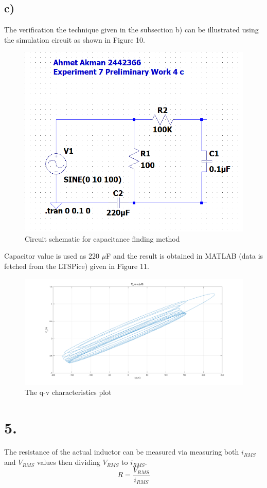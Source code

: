 \documentclass[letterpaper,12pt]{article}
\begin{document}
\subsection{c)}
The verification the technique given in the subsection b) can be illustrated using the simulation circuit as shown in Figure 10.
\begin{figure}[H]
	\centering
   \includegraphics[width=1\textwidth]{Pre4c_sch.png}
   \caption{Circuit schematic for capacitance finding method}
\end{figure} 
Capacitor value is used as 220 \(\mu\)F and the result is obtained in MATLAB (data is fetched from the LTSPice) given in Figure 11.
\begin{figure}[H]
	\centering
   \includegraphics[width=1\textwidth]{PRE_4C.png}
   \caption{The q-v characteristics plot}
\end{figure} 
\section{5.}
The resistance of the actual inductor can be measured via measuring both \(i_{RMS}\) and \(V_{RMS}\) values then dividing  \(V_{RMS}\) to \(i_{RMS}\).
\[ R = \frac{V_{RMS}}{i_{RMS} } \]
\end{document}
